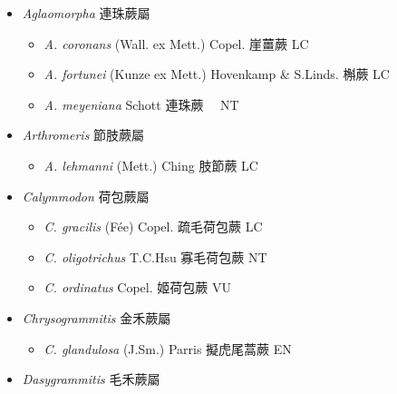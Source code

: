 
  \begin{itemize}
 \item[] \textit{Aglaomorpha} 連珠蕨屬
                                
  \begin{itemize}
        \item[] \textit{A. coronans} (Wall. ex Mett.) Copel.  崖薑蕨   LC
        \item[] \textit{A. fortunei} (Kunze ex Mett.) Hovenkamp \& S.Linds.  槲蕨   LC
        \item[] \textit{A. meyeniana} Schott  連珠蕨　   NT
  \end{itemize}
 \item[] \textit{Arthromeris} 節肢蕨屬
                                
  \begin{itemize}
        \item[] \textit{A. lehmanni} (Mett.) Ching  肢節蕨   LC
  \end{itemize}
 \item[] \textit{Calymmodon} 荷包蕨屬
                                
  \begin{itemize}
        \item[] \textit{C. gracilis} (Fée) Copel.  疏毛荷包蕨   LC
        \item[] \textit{C. oligotrichus} T.C.Hsu  寡毛荷包蕨   NT
        \item[] \textit{C. ordinatus} Copel.  姬荷包蕨   VU
  \end{itemize}
 \item[] \textit{Chrysogrammitis} 金禾蕨屬
                                
  \begin{itemize}
        \item[] \textit{C. glandulosa} (J.Sm.) Parris  擬虎尾蒿蕨   EN
  \end{itemize}
 \item[] \textit{Dasygrammitis} 毛禾蕨屬
                                

\end{itemize}
